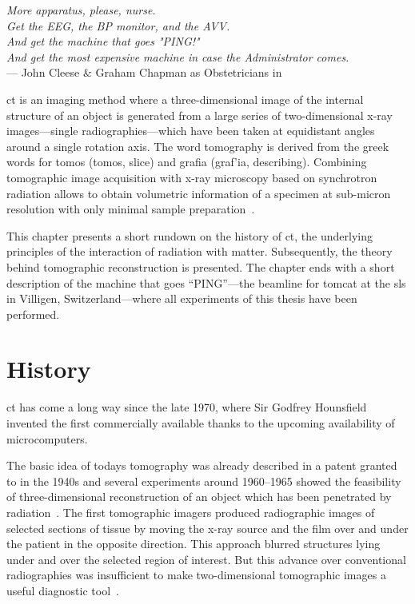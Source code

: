 \acresetall
{}\label{ch:ct}
\begin{flushright}{\slshape More apparatus, please, nurse.\\
				Get the EEG, the BP monitor, and the AVV.\\
				And get the machine that goes "PING!"\\
				And get the most expensive machine in case the Administrator comes.} \\ \medskip
	--- John Cleese \& Graham Chapman as Obstetricians in \citep{TheMeaningOfLife}
\end{flushright}
\vspace{52mm}
\ac{ct} is an imaging method where a three-dimensional image of the internal structure of an object is generated from a large series of two-dimensional x-ray images---single radiographies---which have been taken at equidistant angles around a single rotation axis. The word tomography is derived from the greek words for tomos (\greektext tomos\latintext, slice) and grafia (\greektext graf'ia\latintext, describing). Combining tomographic image acquisition with x-ray microscopy based on synchrotron radiation allows to obtain volumetric information of a specimen at sub-micron resolution with only minimal sample preparation~\cite{Stampanoni2006a}.

This chapter presents a short rundown on the history of \ac{ct}, the underlying principles of the interaction of radiation with matter. Subsequently, the theory behind tomographic reconstruction is presented. The chapter ends with a short description of the machine that goes ``PING''---the beamline for \ac{tomcat} at the \ac{sls} in Villigen, Switzerland---where all experiments of this thesis have been performed.

\section{History}
\acl{ct} has come a long way since the late 1970, where Sir Godfrey Hounsfield invented the first commercially available thanks to the upcoming availability of microcomputers.

The basic idea of todays tomography was already described in a patent granted to \citet{Frank1942} in the 1940s and several experiments around 1960--1965 showed the feasibility of three-dimensional reconstruction of an object which has been penetrated by radiation~\cite{Hsieh2003}. The first tomographic imagers produced radiographic images of selected sections of tissue by moving the x-ray source and the film over and under the patient in the opposite direction. This approach blurred structures lying under and over the selected region of interest. But this advance over conventional radiographies was insufficient to make two-dimensional tomographic images a useful diagnostic tool~\cite{Robb2003}.

